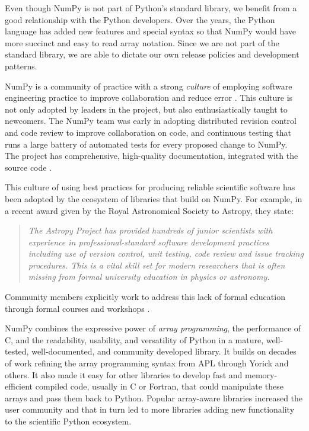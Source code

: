Even though NumPy is not part of Python's standard library,
we benefit from a good relationship with the Python developers.
Over the years, the Python language has added new features and
special syntax so that NumPy would have more succinct and 
easy to read array notation.
Since we are not part of the standard library, we are able to
dictate our own release policies and development patterns.

NumPy is a community of practice with a strong \emph{culture} of
employing software engineering practice to improve collaboration and
reduce error \cite{millman2014developing}.  This culture is not only
adopted by leaders in the project, but also enthusiastically taught to
newcomers. The NumPy team was early in adopting distributed revision
control and code review to improve collaboration on code, and
continuous testing that runs a large battery of automated tests for
every proposed change to NumPy.  The project has comprehensive,
high-quality documentation, integrated with the source
code \cite{vanderwalt2008scipy,harrington2008scipy,harrington2009scipy}.


This culture of using best practices for producing reliable scientific software
has been adopted by the ecosystem of libraries that build on NumPy.
For example, in a recent award given by the Royal Astronomical Society to
Astropy, they state:
\begin{quotation}
\noindent\emph{The Astropy Project has provided hundreds of junior scientists
with experience in professional-standard software development practices
including use of version control, unit testing, code review and issue tracking
procedures. This is a vital skill set for modern researchers that is often
missing from formal university education in physics or astronomy.}
\end{quotation}
Community members explicitly work to address this lack of formal education
through formal courses and workshops
\cite{wilson-software-carpentry,hannay-scientific-software-survey,millman2018teaching}.

NumPy combines the expressive power of \emph{array programming}, 
the performance of C, and
the readability, usability, and versatility of Python in a mature,
well-tested, well-documented, and community developed library.
It builds on decades of work refining the array programming
syntax from APL through Yorick and others.
It also made it easy for other libraries to develop fast and
memory-efficient compiled code, usually in C or Fortran, that could manipulate
these arrays and pass them back to Python.
Popular array-aware libraries increased the user community and that
in turn led to more libraries adding new functionality
to the scientific Python ecosystem.

